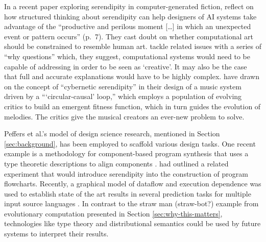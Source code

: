 In a recent paper exploring serendipity in computer-generated fiction,
\citet{mccallum2018} reflect on how structured thinking about
serendipity can help designers of AI systems take advantage of the
``productive and perilous moment [\ldots] in which an unexpected event
or pattern occurs'' (p.~7).  They cast doubt on whether computational
art should be constrained to resemble human art.
\citet{gucklesberger2017addressing} tackle related issues with a
series of ``why questions'' which, they suggest, computational systems
would need to be capable of addressing in order to be seen as
`creative'.  It may also be the case that full and accurate explanations
would have to be highly complex.  \citet{loughran2018serendipity} have
drawn on the concept of ``cybernetic serendipity'' in their design of
a music system driven by a {``}`circular-causal' loop,{''} which
employs a population of evolving critics to build an emergent fitness
function, which in turn guides the evolution of melodies.  The critics
give the musical creators an ever-new problem to solve.

Peffers et al.'s model of design science research, mentioned in
Section \ref{sec:background}, has been employed to scaffold various
design tasks.  One recent example is a methodology for component-based
program synthesis that uses a type theoretic descriptions to align
components \cite{10.1007/978-3-030-03427-6_35}.
\citet{pease2013discussion} had outlined a related experiment that
would introduce serendipity into the construction of program
flowcharts.  Recently, a graphical model of dataflow and execution
dependence was used to establish state of the art results in several
prediction tasks for multiple input source languages
\cite{NIPS2018_7617}.  In contrast to the straw man (straw-bot?)
example from evolutionary computation presented in Section
\ref{sec:why-this-matters}, technologies like type theory and
distributional semantics \cite{DBLP:journals/corr/abs-1803-09473}
could be used by future systems to interpret their results.


